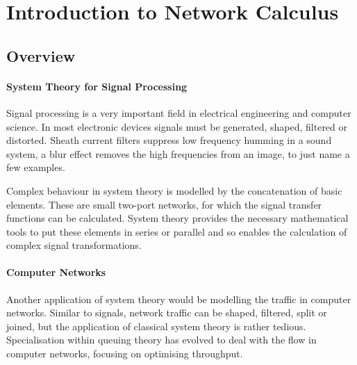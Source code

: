 \section{Introduction to Network Calculus}

\subsection{Overview}

\paragraph{System Theory for Signal Processing} Signal processing is a very important field in electrical engineering and computer science.
In most electronic devices signals must be generated, shaped, filtered or distorted. Sheath current filters suppress low frequency humming in a sound system,
a blur effect removes the high frequencies from an image, to just name a few examples.
\par
Complex behaviour in system theory is modelled by the concatenation of basic elements. These are small two-port networks, for which the signal transfer functions can be calculated.
System theory provides the necessary mathematical tools to put these elements in series or parallel and so enables the calculation of complex signal transformations.
\paragraph{Computer Networks} Another application of system theory would be modelling the traffic in computer networks. 
Similar to signals, network traffic can be shaped, filtered, split or joined, but the application of classical system theory
is rather tedious. Specialisation within queuing theory has evolved
to deal with the flow in computer networks, focusing on optimising throughput.
%
